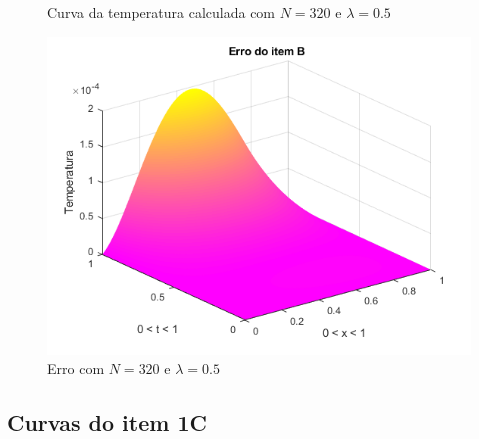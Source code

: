 \documentclass[12pt]{article}
\begin{document}
\begin{spacing}{1.5}
\begin{figure}
    \caption{Curva da temperatura calculada com $N=320$ e $\lambda=0.5$}
    \label{fig:B_n320lambda0-5_calc}
\end{figure}
\begin{figure}
    \centering
    \includegraphics[width=0.8\linewidth]{Primeira_Tarefa/ItemB/n320_lambda0-5_erro.png}
    \caption{Erro com $N=320$ e $\lambda=0.5$}
    \label{fig:B_n320lambda0-5_erro}
\end{figure}


\clearpage
\subsection{Curvas do item 1C} \label{curvas1C}



\end{spacing}
\end{document}
